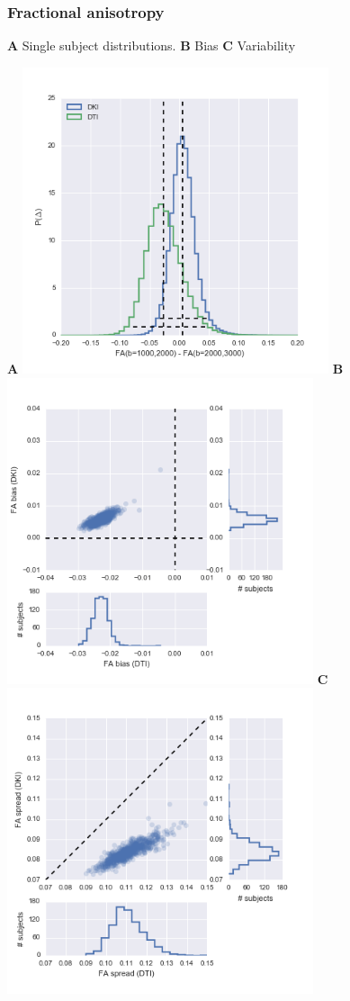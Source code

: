 \documentclass[a0, landscape]{a0poster}
\begin{document}
\begin{multicols}{3}
\subsubsection*{Fractional anisotropy}

\textbf{A} Single subject distributions. \textbf{B} Bias \textbf{C} Variability

\begin{minipage}[b]{1\linewidth}
  \large
  \textbf{A}
  \includegraphics[width=9cm]{reliability_singleton_fa.png}
  \textbf{B}
  \includegraphics[width=9cm]{fa_bias.png}
  \textbf{C}
  \includegraphics[width=9cm]{fa_spread.png}
\end{minipage}




\end{multicols}
\end{document}
